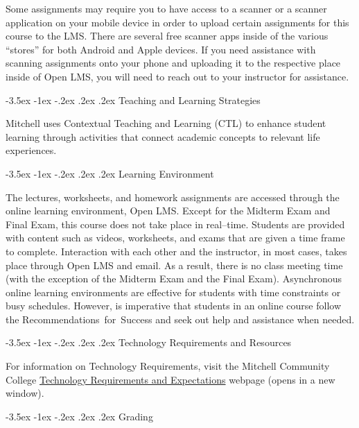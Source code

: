 \documentclass{article}
\makeatletter
\renewcommand\section{\@startsection{section}{1}{0pt}%
  {-3.5ex \@plus -1ex \@minus -.2ex}%
  {.2ex \@plus.2ex}%
  {\normalfont\Large\bfseries}} %
\makeatother
\begin{document}
Some assignments may require you to have access to a scanner or a scanner application on your mobile device in order to upload certain assignments for this course to the LMS. There are several free scanner apps inside of the various ``stores'' for both Android and Apple devices. If you need assistance with scanning assignments onto your phone and uploading it to the respective place inside of Open LMS, you will need to reach out to your instructor for assistance.

\section{Teaching and Learning Strategies}

Mitchell uses Contextual Teaching and Learning (CTL) to enhance student learning through activities that connect academic concepts to relevant life experiences.

\section{Learning Environment}

The lectures, worksheets, and homework assignments are accessed through the online learning environment, Open LMS. Except for the Midterm Exam and Final Exam, this course does not take place in real--time. Students are provided with content such as videos, worksheets, and exams that are given a time frame to complete. Interaction with each other and the instructor, in most cases, takes place through Open LMS and email. As a result, there is no class meeting time (with the exception of the Midterm Exam and the Final Exam). Asynchronous online learning environments are effective for students with time constraints or busy schedules. However, is imperative that students in an online course follow the Recommendations~for~Success and seek out help and assistance when needed.

\section{Technology Requirements and Resources}

For information on Technology Requirements, visit the Mitchell Community College \href{https://www.mitchellcc.edu/college-credit-online-classes/\#online-learning}{Technology Requirements and Expectations} webpage (opens in a new window).

\section{Grading}
\end{document}
